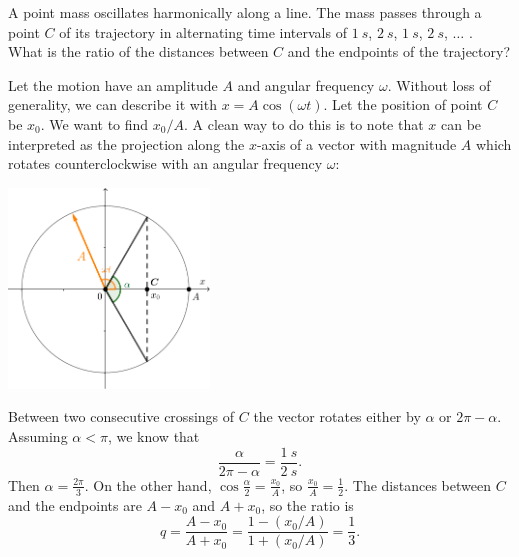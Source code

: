 \documentclass[../TST.tex]{subfiles}
\begin{document}
\begin{pproblem} A point mass oscillates harmonically along a line. The mass passes through a point $C$ of its trajectory in alternating time intervals of $\qty{1}{s}$, $\qty{2}{s}$, $\qty{1}{s}$, $\qty{2}{s}$, $\ldots$ . What is the ratio of the distances between $C$ and the endpoints of the trajectory?
\end{pproblem}
\ifprob \else
	\begin{solution} Let the motion have an amplitude $A$ and angular frequency $\omega$. Without loss of generality, we can describe it with $x=A\cos{(\omega t)}$. Let the position of point $C$ be $x_0$. We want to find $x_0/A$. A clean way to do this is to note that $x$ can be interpreted as the projection along the $x$-axis of a vector with magnitude $A$ which rotates counterclockwise with an angular frequency $\omega$:
		\begin{center}
		\includegraphics[width=0.4\textwidth]{fig/a2012_s1.pdf}
		\end{center}
Between two consecutive crossings of $C$ the vector rotates either by $\alpha$ or $2\pi - \alpha$. Assuming $\alpha <\pi$, we know that
\begin{equation*}
\frac{\alpha}{2\pi-\alpha}=\frac{\qty{1}{s}}{\qty{2}{s}}
.
\end{equation*}
Then $\alpha = \frac{2\pi}{3}$. On the other hand, $\cos{\frac{\alpha}{2}}=\frac{x_0}{A}$, so $\frac{x_0}{A}=\frac{1}{2}$. The distances between $C$ and the endpoints are $A-x_0$ and $A+x_0$, so the ratio is
\begin{equation*}
	q=\frac{A-x_0}{A+x_0}=\frac{1-({x_0}/{A})}{1+({x_0}/{A})}=\boxed{\frac{1}{3}.}
\end{equation*}

\end{solution}
\fi
\end{document}
